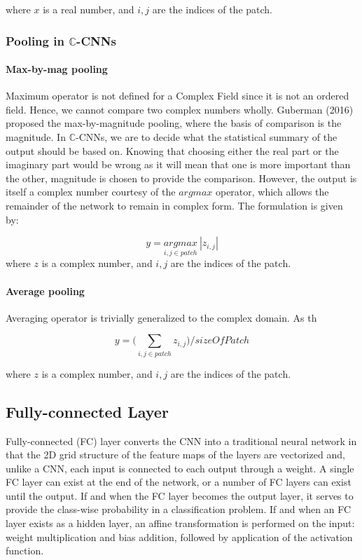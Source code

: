  where $x$ is a real number, and $i,j$ are the indices of the patch.
 \subsubsection{Pooling in $\mathbb{C}$-CNNs}
 \paragraph{Max-by-mag pooling}
 Maximum operator is not defined for a Complex Field since it is not an ordered field. Hence, we cannot compare two complex numbers wholly. Guberman (2016) \cite{Guberman} proposed the max-by-magnitude pooling, where the basis of comparison is the magnitude. In $\mathbb{C}$-CNNs, we are to decide what the statistical summary of the output should be based on. Knowing that choosing either the real part or the imaginary part would be wrong as it will mean that one is more important than the other, magnitude is chosen to provide the comparison. However, the output is itself a complex number courtesy of the $argmax$ operator, which allows the remainder of the network to remain in complex form. The formulation is given by:
 

 
\begin{equation}
y = \underset{i,j \in patch}{argmax} \ |z_{i,j}|
\end{equation}
 where $z$ is a complex number, and $i,j$ are the indices of the patch.
\paragraph{Average pooling}
Averaging operator is trivially generalized to the complex domain. As th  
 
 
  \begin{equation}
 y = \bigg(\underset{i,j \in patch}{\sum} z_{i,j} \bigg)/ sizeOfPatch
 \end{equation}
 
 where $z$ is a complex number, and $i,j$ are the indices of the patch.
 
 \subsection{Fully-connected Layer}
 Fully-connected (FC) layer converts the CNN into a traditional neural network in that the 2D grid structure of the feature maps of the layers are vectorized and, unlike a CNN, each input is connected to each output through a weight. A single FC layer can exist at the end of the network, or a number of FC layers can exist until the output. If and when the FC layer becomes the output layer, it serves to provide the class-wise probability in a classification problem. If and when an FC layer exists as a hidden layer, an affine transformation is performed on the input: weight multiplication and bias addition, followed by application of the activation function.
 
